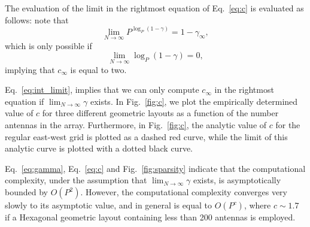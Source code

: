 \documentclass[useAMS,usenatbib]{mn2e}
\begin{document}
The evaluation of the limit in the rightmost equation of Eq.~\eqref{eq:c} is evaluated as follows: 
note that
\begin{equation}
\label{eq:int_limit}
\lim_{N\rightarrow\infty} P^{\log_{P}(1-\gamma)} = 1-\gamma_{\infty},
\end{equation}
which is only possible if 
\begin{equation}
\lim_{N\rightarrow\infty} \log_{P}(1-\gamma) = 0,
\end{equation}
implying that $c_{\infty}$ is equal to two.

Eq.~\eqref{eq:int_limit}, implies that we can only compute $c_{\infty}$ in the rightmost equation if $\lim_{N\rightarrow \infty} \gamma$ exists. 
In Fig.~\ref{fig:c}, we plot the empirically determined value of $c$ for three different geometric layouts as a function of the number antennas in the array.
Furthermore, in Fig.~\ref{fig:c}, the analytic value of $c$ for the regular east-west grid is plotted as a dashed red curve, while the limit of this analytic curve is plotted with a dotted black curve. 

Eq.~\eqref{eq:gamma}, Eq.~\eqref{eq:c} and Fig.~\ref{fig:sparsity} indicate that the computational complexity, under the assumption that $\lim_{N\rightarrow \infty} \gamma$ exists, is asymptotically bounded by $O(P^2)$.
However, the computational complexity converges very slowly to its asymptotic value, and in general is equal to $O(P^{c})$, where $c \sim 1.7$ if a Hexagonal geometric layout containing less than 200 antennas is employed.
\end{document}
